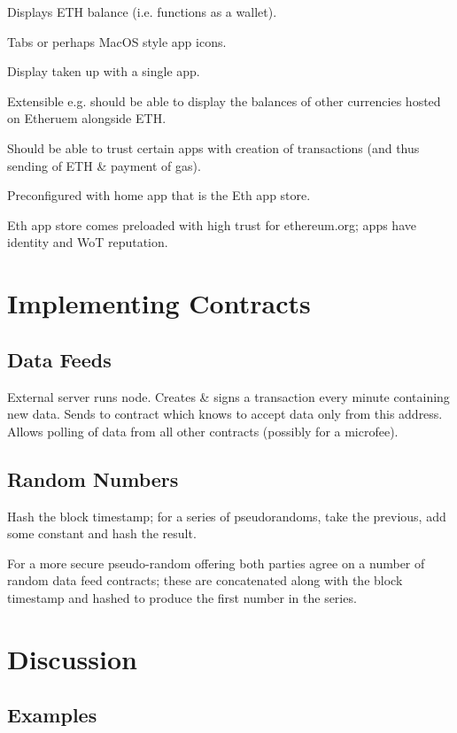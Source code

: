 \documentclass[9pt,oneside]{amsart}
\makeatletter
\newcommand*\eg{e.g.\@\xspace}
\makeatother
\begin{document}
\begin{multicols}{2}
Displays ETH balance (i.e. functions as a wallet).

Tabs or perhaps MacOS style app icons.

Display taken up with a single app.

Extensible \eg should be able to display the balances of other currencies hosted on Etheruem alongside ETH.

Should be able to trust certain apps with creation of transactions (and thus sending of ETH \& payment of gas).

Preconfigured with home app that is the Eth app store.

Eth app store comes preloaded with high trust for ethereum.org; apps have identity and WoT reputation.

\section{Implementing Contracts}

\subsection{Data Feeds}

External server runs node. Creates \& signs a transaction every minute containing new data. Sends to contract which knows to accept data only from this address. Allows polling of data from all other contracts (possibly for a microfee).

\subsection{Random Numbers}

Hash the block timestamp; for a series of pseudorandoms, take the previous, add some constant and hash the result.

For a more secure pseudo-random offering both parties agree on a number of random data feed contracts; these are concatenated along with the block timestamp and hashed to produce the first number in the series.

\section{Discussion} \label{ch:discussion}

\subsection{Examples} \label{ch:examples}


\end{multicols}
\end{document}
